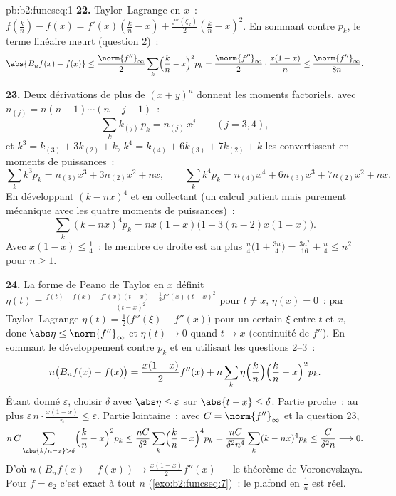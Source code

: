\begin{solution}{pb:b2:funcseq:1}
\textbf{22.} Taylor--Lagrange en $x$~: $f(\frac kn) - f(x) =
f'(x)(\frac kn - x) + \frac{f''(\xi_k)}2(\frac kn - x)^2$.
En sommant contre $p_k$, le terme linéaire meurt (question 2)~:
\[
\abs{B_nf(x) - f(x)}
\leq \frac{\norm{f''}_\infty}{2}\sum_k\Bigl(\frac kn -
x\Bigr)^2p_k
= \frac{\norm{f''}_\infty}{2}\cdot\frac{x(1-x)}{n}
\leq \frac{\norm{f''}_\infty}{8n} .
\]

\textbf{23.} Deux dérivations de plus de $(x+y)^n$ donnent les
moments factoriels, avec $n_{(j)} = n(n-1)\cdots(n-j+1)$~:
\[
\sum_k k_{(j)}\,p_k = n_{(j)}\,x^j \qquad (j = 3, 4),
\]
et $k^3 = k_{(3)} + 3k_{(2)} + k$, $k^4 = k_{(4)} + 6k_{(3)} +
7k_{(2)} + k$ les convertissent en moments de puissances~:
\[
\sum_k k^3p_k = n_{(3)}x^3 + 3n_{(2)}x^2 + nx,
\qquad
\sum_k k^4p_k = n_{(4)}x^4 + 6n_{(3)}x^3 + 7n_{(2)}x^2 + nx .
\]
En développant $(k - nx)^4$ et en collectant (un calcul patient mais
purement mécanique avec les quatre moments de puissances)~:
\[
\sum_k(k-nx)^4p_k = nx(1-x)\bigl(1 + 3(n-2)x(1-x)\bigr) .
\]
Avec $x(1-x) \leq \frac14$~: le membre de droite est au plus
$\frac n4\bigl(1 + \frac{3n}4\bigr) = \frac{3n^2}{16} +
\frac n4 \leq n^2$ pour $n \geq 1$.

\textbf{24.} La forme de Peano de Taylor en $x$ définit $\eta(t) =
\frac{f(t) - f(x) - f'(x)(t-x) - \frac12f''(x)(t-x)^2}
{(t-x)^2}$ pour $t \neq x$, $\eta(x) = 0$~: par Taylor--Lagrange
$\eta(t) = \frac12\bigl(f''(\xi) - f''(x)\bigr)$ pour un certain $\xi$
entre $t$ et $x$, donc $\abs\eta \leq \norm{f''}_\infty$ et
$\eta(t) \to 0$ quand $t \to x$ (continuité de $f''$). En sommant
le développement contre $p_k$ et en utilisant les questions 2--3~:
\[
n\bigl(B_nf(x) - f(x)\bigr)
= \frac{x(1-x)}{2}f''(x)
+ n\sum_k\eta\Bigl(\frac kn\Bigr)\Bigl(\frac kn -
x\Bigr)^2p_k .
\]
Étant donné $\varepsilon$, choisir $\delta$ avec $\abs\eta \leq
\varepsilon$ sur $\abs{t - x}\leq\delta$. Partie proche~: au plus
$\varepsilon\,n\cdot\frac{x(1-x)}n \leq \varepsilon$. Partie lointaine~:
avec $C = \norm{f''}_\infty$ et la question 23,
\[
n\,C\sum_{\abs{k/n-x}>\delta}\Bigl(\frac kn -
x\Bigr)^2p_k
\leq \frac{nC}{\delta^2}\sum_k\Bigl(\frac kn -
x\Bigr)^4p_k
= \frac{nC}{\delta^2 n^4}\sum_k(k-nx)^4p_k
\leq \frac{C}{\delta^2 n} \longrightarrow 0 .
\]
D'où $n(B_nf(x) - f(x)) \to \frac{x(1-x)}2f''(x)$ ---
le théorème de Voronovskaya. Pour $f = e_2$ c'est exact à tout
$n$ (\cref{exo:b2:funcseq:7})~: le plafond en $\frac1n$ est réel.


\end{solution}
